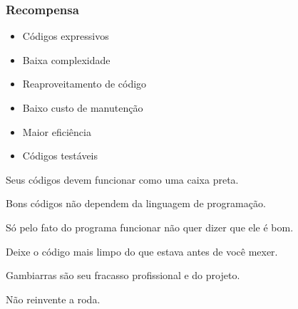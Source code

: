 \begin{frame}
	\frametitle{Recompensa}

	\begin{itemize}
		\item Códigos expressivos
		\item Baixa complexidade
		\item Reaproveitamento de código
		\item Baixo custo de manutenção
		\item Maior eficiência
		\item Códigos testáveis
	\end{itemize}
\end{frame}

\begin{frame}
	\Huge Seus códigos devem funcionar como uma caixa preta.
\end{frame}

\begin{frame}
	\Huge Bons códigos não dependem da linguagem de programação.
\end{frame}

\begin{frame}
	\Huge Só pelo fato do programa funcionar não quer dizer que ele é bom.
\end{frame}

\begin{frame}
	\Huge Deixe o código mais limpo do que estava antes de você mexer.
\end{frame}

\begin{frame}
	\Huge Gambiarras são seu fracasso profissional e do projeto.
\end{frame}

\begin{frame}
	\Huge Não reinvente a roda.
\end{frame}

